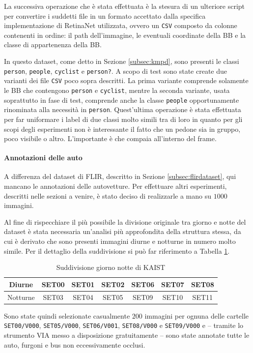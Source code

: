 La successiva operazione che è stata effettuata è la stesura di un ulteriore script per convertire i suddetti file in un formato accettato dalla specifica implementazione di RetinaNet utilizzata, ovvero un \texttt{CSV} composto da colonne contenenti in ordine: il path dell'immagine, le eventuali coordinate della \ac{BB} e la classe di appartenenza della \ac{BB}. 

In questo dataset, come detto in Sezione \ref{subsec:kmpd}, sono presenti le classi \texttt{person}, \texttt{people}, \texttt{cyclist} e \texttt{person?}. A scopo di test sono state create due varianti dei file \texttt{CSV} poco sopra descritti. La prima variante comprende solamente le \ac{BB} che contengono \texttt{person} e \texttt{cyclist}, mentre la seconda variante, usata soprattutto in fase di test, comprende anche la classe \texttt{people} opportunamente rinominata alla necessità in \texttt{person}. Quest'ultima operazione è stata effettuata per far uniformare i label di due classi molto simili tra di loro in quanto per gli scopi degli esperimenti non è interessante il fatto che un pedone sia in gruppo, poco visibile o altro. L'importante è che compaia all'interno del frame. 
\paragraph{Annotazioni delle auto}
A differenza del dataset di FLIR, descritto in Sezione \ref{subsec:flirdataset}, qui mancano le annotazioni delle autovetture. Per effettuare altri esperimenti, descritti nelle sezioni a venire, è stato deciso di realizzarle a mano su $1000$ immagini. 

Al fine di rispecchiare il più possibile la divisione originale tra giorno e notte del dataset è stata necessaria un'analisi più approfondita della struttura stessa, da cui è derivato che sono presenti immagini diurne e notturne in numero molto simile. Per il dettaglio della suddivisione si può far riferimento a Tabella \ref{table:day_night_kaist}.
\begin{table}[]
    \begin{tabular}{c|cccccc}
    Diurne & SET00 & SET01 & SET02 & SET06 & SET07 & SET08 \\ \hline
    Notturne & SET03 & SET04 & SET05 & SET09 & SET10 & SET11
    \end{tabular}
    \caption{Suddivisione giorno notte di KAIST}
    \label{table:day_night_kaist}
\end{table}
Sono state quindi selezionate casualmente $200$ immagini per ognuna delle cartelle \texttt{SET00/V000}, \texttt{SET05/V000}, \texttt{SET06/V001}, \texttt{SET08/V000} e \texttt{SET09/V000} e -- tramite lo strumento \ac{VIA} \cite{dutta2019vgg, dutta2016via} messo a disposizione gratuitamente -- sono state annotate tutte le auto, furgoni e bus non eccessivamente occlusi. 

